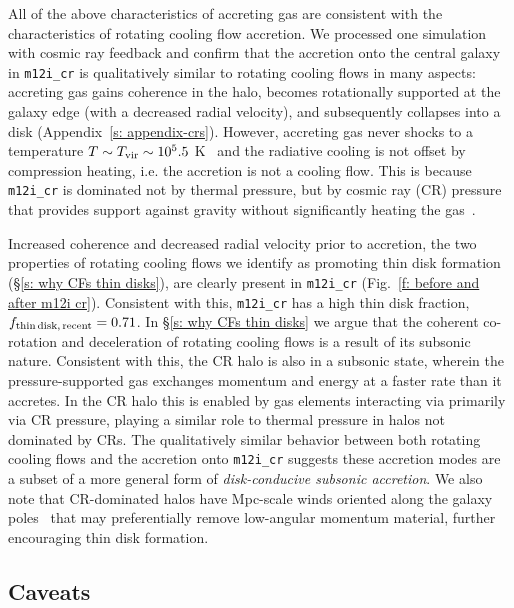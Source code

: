 \documentclass[fleqn,usenatbib]{mnras}
\begin{document}
All of the above characteristics of accreting gas are consistent with the characteristics of rotating cooling flow accretion.
We processed one simulation with cosmic ray feedback and confirm that the accretion onto the central galaxy in \texttt{m12i\_cr} is qualitatively similar to rotating cooling flows in many aspects:
accreting gas gains coherence in the halo, becomes rotationally supported at the galaxy edge (with a decreased radial velocity), and subsequently collapses into a disk (Appendix~\ref{s: appendix-crs}).
However, accreting gas never shocks to a temperature $T \sim T_{\rm vir} \sim 10^5.5$ K~\citep{Ji2020} and the radiative cooling is not offset by compression heating, i.e. the accretion is not a cooling flow.
This is because \texttt{m12i\_cr} is dominated not by thermal pressure, but by cosmic ray (CR) pressure that provides support against gravity without significantly heating the gas~\citep{Ji2020a}.

Increased coherence and decreased radial velocity prior to accretion, the two properties of rotating cooling flows we identify as promoting thin disk formation (\S\ref{s: why CFs thin disks}), are clearly present in \texttt{m12i\_cr} (Fig.~\ref{f: before and after m12i cr}).
Consistent with this, \texttt{m12i\_cr} has a high thin disk fraction, $f_{\rm thin\,disk,\,recent}=0.71$.
In \S\ref{s: why CFs thin disks} we argue that the coherent co-rotation and deceleration of rotating cooling flows is a result of its subsonic nature.
Consistent with this, the CR halo is also in a subsonic state, wherein the pressure-supported gas exchanges momentum and energy at a faster rate than it accretes.
In the CR halo this is enabled by gas elements interacting via primarily via CR pressure, playing a similar role to thermal pressure in halos not dominated by CRs.
The qualitatively similar behavior between both rotating cooling flows and the accretion onto \texttt{m12i\_cr} suggests these accretion modes are a subset of a more general form of \textit{disk-conducive subsonic accretion}.
We also note that CR-dominated halos have Mpc-scale winds oriented along the galaxy poles~\citep{Hopkins2021} that may preferentially remove low-angular momentum material, further encouraging thin disk formation.

\subsection{Caveats}
\label{s: caveats}

\end{document}
